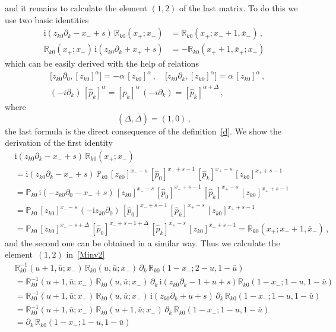 \documentclass[a4paper,11pt]{article}
\renewcommand{\imath}{\mathrm{i}}
\numberwithin{equation}{section}
\begin{document}
and it remains to calculate the element $(1,2)$ of the last matrix.
To do this we use two basic identities
\begin{align}
	\nonumber
	\imath(z_{k0}\partial_k-x_-+s)\,\mathbb{R}_{k0}(x_+;x_-) & =
	\mathbb{R}_{k0}(x_+;x_-+1,\bar{x}_-) \,, \\
	\nonumber
	\mathbb{R}_{k0}(x_+;x_-) \, \imath(z_{k0}\partial_k+x_++s) & =
	-\mathbb{R}_{k0}(x_++1,\bar{x}_+;x_-)
\end{align}
which can be easily derived with the help of relations
\begin{align}
	& \nonumber
	\bigl[z_{k0}\partial_0,[z_{k0}]^\alpha\bigr]=-\alpha\,[z_{k0}]^\alpha \,,
	\quad
	\bigl[z_{k0}\partial_k,[z_{k0}]^\alpha\bigr]=\alpha\,[z_{k0}]^\alpha \,, \\
	& \label{dp}
	(-i\partial_k)\,[\hat{p}_k]^\alpha=[\hat{p}_k]^\alpha\,(-i\partial_k)=[\hat{p}_k]^{\alpha+\Delta} \,,
\end{align}
where
\begin{equation} \label{Del}
	(\Delta,\bar{\Delta})=(1,0) \,,
\end{equation}
the last formula is the direct consequence of the definition~\eqref{d}.
We show the derivation of the first identity
\begin{align*}
	&
	\imath(z_{k0}\partial_k-x_-+s)\,\mathbb{R}_{k0}(x_+;x_-) \\
	&
	=
	\imath(z_{k0}\partial_k-x_-+s) \,
	\mathbb{P}_{k0}\,[z_{k0}]^{x_--s}\,[\hat{p}_0]^{x_-+s-1}\, [\hat{p}_k]^{x_+-s}\, [z_{k0}]^{x_++s-1} \\
	&
	= \mathbb{P}_{k0}\,\imath(-z_{k0}\partial_0-x_-+s)\,[z_{k0}]^{x_--s}\,[\hat{p}_0]^{x_-+s-1}\, [\hat{p}_k]^{x_+-s}\, [z_{k0}]^{x_++s-1} \\
	&
	= \mathbb{P}_{k0}\,[z_{k0}]^{x_--s}\,(-\imath z_{k0}\partial_0)\,[\hat{p}_0]^{x_-+s-1}\, [\hat{p}_k]^{x_+-s}\, [z_{k0}]^{x_++s-1} \\
	&
	= \mathbb{P}_{k0}\,[z_{k0}]^{x_--s+\Delta}\,[\hat{p}_0]^{x_-+s-1+\Delta}\, [\hat{p}_k]^{x_+-s}\, [z_{k0}]^{x_++s-1}
	= \mathbb{R}_{k0}(x_+;x_-+1,\bar{x}_-) \,,
\end{align*}
and the second one can be obtained in a similar way.
Thus we calculate the element~$(1,2)$ in~\eqref{Minv2} 
\begin{align*}
	&
	\mathbb{R}_{k0}^{-1}(u+1,\bar{u};x_-)\,\mathbb{R}_{k0}(u,\bar{u};x_-)\,
	\partial_k\,\mathbb{R}_{k0}(1-x_-;2-u,1-\bar{u}) \\
	&
	= \mathbb{R}_{k0}^{-1}(u+1,\bar{u};x_-)\,\mathbb{R}_{k0}(u,\bar{u};x_-)\,
	\partial_k\,\imath(z_{k0}\partial_k-1+u+s)\mathbb{R}_{k0}(1-x_-;1-u,1-\bar{u}) \\
	&
	= \mathbb{R}_{k0}^{-1}(u+1,\bar{u};x_-)\,\mathbb{R}_{k0}(u,\bar{u};x_-)\,\imath(z_{k0}\partial_k+u+s)\,
	\partial_k\,\mathbb{R}_{k0}(1-x_-;1-u,1-\bar{u}) \\
	&
	= \mathbb{R}_{k0}^{-1}(u+1,\bar{u};x_-)\,\mathbb{R}_{k0}(u+1,\bar{u};x_-)\,
	\partial_k\,\mathbb{R}_{k0}(1-x_-;1-u,1-\bar{u}) \\
	&
	= \partial_k\,\mathbb{R}_{k0}(1-x_-;1-u,1-\bar{u})
\end{align*}
\end{document}

